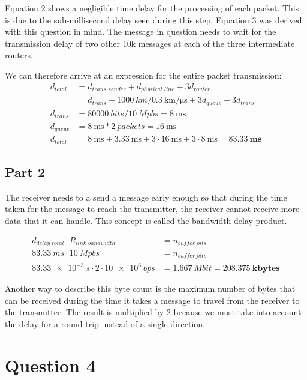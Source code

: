 \documentclass[12pt,letterpaper]{article}
\begin{document}
Equation 2 shows a negligible time delay for the processing of each packet. This
is due to the sub-millisecond delay seen during this step.
Equation 3 was derived with this question in mind. The message in question needs
to wait for the transmission delay of two other 10k messages at each of the three
intermediate routers.

We can therefore arrive at an expression for the entire packet transmission:
\begin{align*}
d_{total} &= d_{trans\_sender} + d_{physical\_line} + 3d_{router} \\
&= d_{trans} + \SI{1000}{km}/\SI{0.3}{\km\per\us} + 3d_{queue} + 3d_{trans} \\
d_{trans} &= \SI{80000}{bits} / \SI{10}{Mpbs} = \SI{8}{\ms} \\
d_{queue} &= \SI{8}{\ms} * \SI{2}{packets} = \SI{16}{\ms} \\
d_{total} &= \SI{8}{\ms} + \SI{3.33}{\ms} + 3\cdot\SI{16}{\ms} + 3\cdot\SI{8}{\ms} = \pmb{\SI{83.33}{\ms}}
\end{align*}

\subsection*{Part 2}
The receiver needs to a send a message early enough so that during the time
taken for the message to reach the transmitter, the receiver cannot receive
more data that it can handle. This concept is called the bandwidth-delay product.

\begin{align*}
d_{delay\_total} \cdot R_{link\_bandwidth} &= n_{buffer\_bits} \\
\SI{83.33}{ms} \cdot \SI{10}{Mpbs} &= n_{buffer\_bits} \\
\SI{83.33e-3}{s} \cdot 2 \cdot \SI{10e6}{bps} &= \SI{1.667}{Mbit} = \pmb{\SI{208.375}{kbytes}}
\end{align*}

Another way to describe this byte count is the maximum number of bytes that
can be received during the time it takes a message to travel from the receiver
to the transmitter. The result is multiplied by $2$ because we must take into account
the delay for a round-trip instead of a single direction.

\section*{Question 4}
\end{document}
